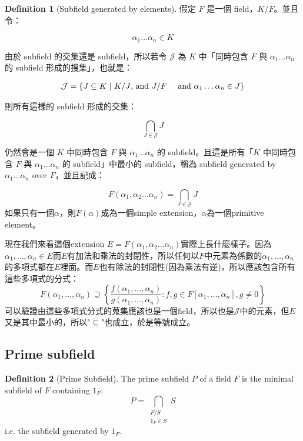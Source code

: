 \documentclass{article}
\theoremstyle{definition}
\newtheorem{dfn}{Definition}
\begin{document}
\begin{dfn}[Subfield generated by elements]
	假定 $F$ 是一個 field，$K/F$。並且令：

	$$
		\alpha_1 \dots \alpha_n \in K
	$$

	由於 subfield 的交集還是 subfield，所以若令 $\mathcal J$ 為 $K$ 中「同時包含 $F$ 與 $\alpha_1 \dots \alpha_n$ 的 subfield 形成的搜集」，也就是：

	$$
		\begin{aligned}
			\mathcal J = \{J \subseteq K  \mid\  & K/J \text{, and }J/F
			\newline
			                                     & \text{ and } \alpha_1 \dots \alpha_n \in J\}
		\end{aligned}
	$$

	則所有這樣的 subfield 形成的交集：

	$$
		\bigcap_{J \in \mathcal J}J
	$$

	仍然會是一個 $K$ 中同時包含 $F$ 與 $\alpha_1 \dots \alpha_n$ 的 subfield。且這是所有「$K$ 中同時包含 $F$ 與 $\alpha_1 \dots \alpha_n$ 的 subfield」中最小的 subfield，稱為 subfield generated by $\alpha_1 \dots \alpha_n$ over $F$，並且記成：

	$$
		F(\alpha_1, \alpha_2 \dots \alpha_n) = \bigcap_{J \in \mathcal J}J
	$$
	如果只有一個$\alpha$，則$F(\alpha)$成為一個simple extension，$\alpha$為一個primitive element。
\end{dfn}

現在我們來看這個extension $E=F(\alpha_1, \alpha_2 \dots \alpha_n)$實際上長什麼樣子。因為$\alpha_1, \dots, \alpha_n\in E$而$E$有加法和乘法的封閉性，所以任何以$F$中元素為係數的$\alpha_1, \dots, \alpha_n$的多項式都在$E$裡面。而$E$也有除法的封閉性(因為乘法有逆)，所以應該包含所有這些多項式的分式：
\[
	F(\alpha_1, \dots, \alpha_n)\supseteq\left\{
	\frac{f(\alpha_1, \dots, \alpha_n)}{g(\alpha_1, \dots, \alpha_n)}: f,g\in F[\alpha_1, \dots, \alpha_n], g\neq 0
	\right\}
\]
可以驗證由這些多項式分式的蒐集應該也是一個field，所以也是$\mathcal J$中的元素，但$E$又是其中最小的，所以"$\subseteq$"也成立，於是等號成立。

\subsection{Prime subfield}

\begin{dfn}[Prime Subfield]
	The prime subfield $P$ of a field $F$ is the minimal subfield of $F$ containing $1_F$:
	\[
		P=\bigcap_{
			\substack{F/S \\ 1_F\in S}
		} S
	\]
	i.e. the subfield generated by $1_F$.
\end{dfn}
\end{document}
